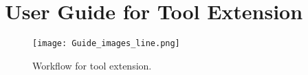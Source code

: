 \chapter{User Guide for Tool Extension}\label{ap:guide}


\begin{figure}[H]
  \centering
    \texttt{[image: Guide\_images\_line.png]}
      \caption{Workflow for tool extension.}
      \label{fig:extension}
\end{figure}

